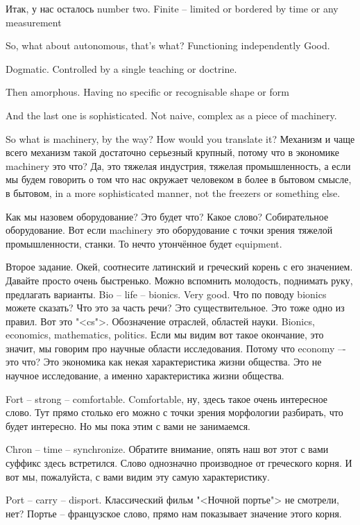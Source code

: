 \documentclass[main.tex]{subfiles}
\begin{document}
Итак, у нас осталось number two.
Finite -- limited or bordered by time or any measurement

So, what about autonomous, that's what?
Functioning independently
Good.

Dogmatic.
Controlled by a single teaching or doctrine.

Then amorphous.
Having no specific or recognisable shape or form

And the last one is sophisticated.
Not naive, complex as a piece of machinery.

So what is machinery, by the way?
How would you translate it?
Механизм и чаще всего механизм такой достаточно серьезный крупный, потому что в экономике machinery это что?
Да, это тяжелая индустрия, тяжелая промышленность, а если мы будем говорить о том что нас окружает человеком в более в бытовом смысле, в бытовом, in a more sophisticated manner, not the freezers or something else.

Как мы назовем оборудование? Это будет что? Какое слово? Собирательное оборудование.
Вот если machinery это оборудование с точки зрения тяжелой промышленности, станки.
То нечто утончённое будет equipment.

Второе задание.
Окей, соотнесите латинский и греческий корень с его значением.
Давайте просто очень быстренько.
Можно вспомнить молодость, поднимать руку, предлагать варианты.
Bio -- life -- bionics.
Very good.
Что по поводу bionics можете сказать?
Что это за часть речи?
Это существительное.
Это тоже одно из правил.
Вот это "<cs">.
Обозначение отраслей, областей науки.
Bionics, economics, mathematics, politics.
Если мы видим вот такое окончание, это значит, мы говорим про научные области исследования.
Потому что economy –- это что?
Это экономика как некая характеристика жизни общества.
Это не научное исследование, а именно характеристика жизни общества.

Fort -- strong -- comfortable.
Comfortable, ну, здесь такое очень интересное слово.
Тут прямо столько его можно с точки зрения морфологии разбирать, что будет интересно.
Но мы пока этим с вами не занимаемся.

Chron -- time -- synchronize.
Обратите внимание, опять наш вот этот с вами суффикс здесь встретился.
Слово однозначно производное от греческого корня.
И вот мы, пожалуйста, с вами видим эту самую характеристику.

Port -- carry -- disport.
Классический фильм "<Ночной портье"> не смотрели, нет?
Портье -- французское слово, прямо нам показывает значение этого корня.
\end{document}
